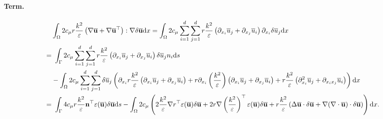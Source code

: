 \documentclass[oneside,11pt]{book}
\numberwithin{equation}{section}
\begin{document}
\paragraph*{Term.}
\begin{align*}
    &\int_\Omega 2c_\mu r\frac{k^2}{\varepsilon}\left(\nabla\overline{\bf u} + \nabla\overline{\bf u}^\top\right):\nabla\delta\overline{\bf u}{\rm d}x = \int_\Omega 2c_\mu\sum_{i=1}^d\sum_{j=1}^d r\frac{k^2}{\varepsilon}\left(\partial_{x_i}\overline{u}_j + \partial_{x_j}\overline{u}_i\right)\partial_{x_i}\delta\overline{u}_j{\rm d}x\\
    =&\ \int_\Gamma 2c_\mu\sum_{i=1}^d\sum_{j=1}^d r\frac{k^2}{\varepsilon}\left(\partial_{x_i}\overline{u}_j + \partial_{x_j}\overline{u}_i\right)\delta\overline{u}_jn_i{\rm d}s\\
    &-\int_\Omega 2c_\mu\sum_{i=1}^d\sum_{j=1}^d \delta\overline{u}_j\left(\partial_{x_i}r\frac{k^2}{\varepsilon}\left(\partial_{x_i}\overline{u}_j + \partial_{x_j}\overline{u}_i\right) + r\partial_{x_i}\left(\frac{k^2}{\varepsilon}\right)\left(\partial_{x_i}\overline{u}_j + \partial_{x_j}\overline{u}_i\right) + r\frac{k^2}{\varepsilon}\left(\partial_{x_i}^2\overline{u}_j + \partial_{x_ix_j}\overline{u}_i\right)\right){\rm d}x\\
    =&\ \int_\Gamma 4c_\mu r\frac{k^2}{\varepsilon}{\bf n}^\top\varepsilon(\overline{\bf u})\delta\overline{\bf u}{\rm d}s - \int_\Omega 2c_\mu\left(2\frac{k^2}{\varepsilon}\nabla r^\top\varepsilon(\overline{\bf u})\delta\overline{\bf u} + 2r\nabla\left(\frac{k^2}{\varepsilon}\right)^\top\varepsilon(\overline{\bf u})\delta\overline{\bf u} + r\frac{k^2}{\varepsilon}\left(\Delta\overline{\bf u}\cdot\delta\overline{\bf u} + \nabla(\nabla\cdot\overline{\bf u})\cdot\delta\overline{\bf u}\right)\right){\rm d}x.
\end{align*}
\end{document}
